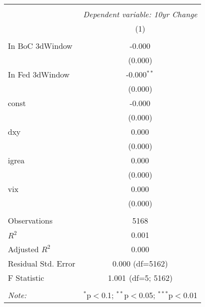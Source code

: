 \begin{table}[!htbp] \centering
\begin{tabular}{@{\extracolsep{5pt}}lc}
\\[-1.8ex]\hline
\hline \\[-1.8ex]
& \multicolumn{1}{c}{\textit{Dependent variable: 10yr Change}} \
\cr \cline{2-2}
\\[-1.8ex] & (1) \\
\hline \\[-1.8ex]
 In BoC 3dWindow & -0.000$^{}$ \\
& (0.000) \\
 In Fed 3dWindow & -0.000$^{**}$ \\
& (0.000) \\
 const & -0.000$^{}$ \\
& (0.000) \\
 dxy & 0.000$^{}$ \\
& (0.000) \\
 igrea & 0.000$^{}$ \\
& (0.000) \\
 vix & 0.000$^{}$ \\
& (0.000) \\
\hline \\[-1.8ex]
 Observations & 5168 \\
 $R^2$ & 0.001 \\
 Adjusted $R^2$ & 0.000 \\
 Residual Std. Error & 0.000 (df=5162) \\
 F Statistic & 1.001$^{}$ (df=5; 5162) \\
\hline
\hline \\[-1.8ex]
\textit{Note:} & \multicolumn{1}{r}{$^{*}$p$<$0.1; $^{**}$p$<$0.05; $^{***}$p$<$0.01} \\
\end{tabular}
\end{table}